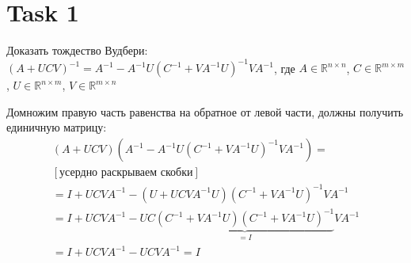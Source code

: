 \section{Task 1}

\begin{task}
    Доказать тождество Вудбери: $(A + UCV)^{-1} = A^{-1} - A^{-1}U(C^{-1} + VA^{-1}U)^{-1}VA^{-1}$, где $A \in \mathbb{R}^{n \times n}$, $C \in \mathbb{R}^{m \times m}$, $U \in \mathbb{R}^{n \times m}$, $V \in \mathbb{R}^{m \times n}$
\end{task}


\begin{solution}
    Домножим правую часть равенства на обратное от левой части, должны получить единичную матрицу:
    \begin{gather}
        (A + UCV)(A^{-1} - A^{-1}U(C^{-1} + VA^{-1}U)^{-1}VA^{-1}) = \\
        [\text{усердно раскрываем скобки}] \\
        = I + UCVA^{-1} - (U + UCVA^{-1}U)(C^{-1} + VA^{-1}U)^{-1}VA^{-1} \\
        = I + UCVA^{-1} - UC\underbrace{(C^{-1} + VA^{-1}U)(C^{-1} + VA^{-1}U)^{-1}}_{=I}VA^{-1} \\
        = I + UCVA^{-1} - UCVA^{-1} = I
    \end{gather}
\end{solution}
